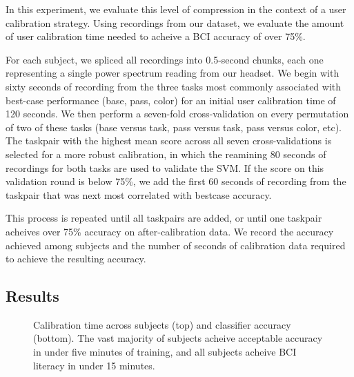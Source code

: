 In this experiment, we evaluate this level of compression in the context of a user calibration strategy. Using recordings from our dataset, we evaluate the amount of user calibration time needed to acheive a BCI accuracy of over 75\%.

For each subject, we spliced all recordings into 0.5-second chunks, each one representing a single power spectrum reading from our headset. We begin with sixty seconds of recording from the three tasks most commonly associated with best-case performance (base, pass, color) for an initial user calibration time of 120 seconds. We then perform a seven-fold cross-validation on every permutation of two of these tasks (base versus task, pass versus task, pass versus color, etc). The taskpair with the highest mean score across all seven cross-validations is selected for a more robust calibration, in which the reamining 80 seconds of recordings for both tasks are used to validate the SVM. If the score on this validation round is below 75\%, we add the first 60 seconds of recording from the taskpair that was next most correlated with bestcase accuracy. 

This process is repeated until all taskpairs are added, or until one taskpair acheives over 75\% accuracy on after-calibration data. We record the accuracy achieved among subjects and the number of seconds of calibration data required to achieve the resulting accuracy.

\subsection{Results}

\begin{figure}[!h]
  \vspace{-0.2cm}
  \centering
   {}
  \caption{Calibration time across subjects (top) and classifier accuracy (bottom). The vast majority of subjects acheive acceptable accuracy in under five minutes of training, and all subjects acheive BCI literacy in under 15 minutes. }
  \label{fig:fig2}
  \vspace{-0.1cm}
\end{figure}





